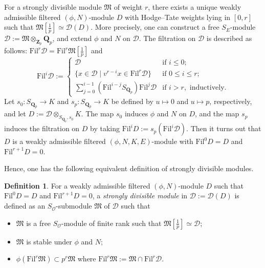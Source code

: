 \documentclass[11pt]{amsart}
\theoremstyle{definition}
\numberwithin{equation}{subsection}
\theoremstyle{plain}
\theoremstyle{plain}
\theoremstyle{plain}
\theoremstyle{plain}
\theoremstyle{plain}
\theoremstyle{plain}
\theoremstyle{plain}
\theoremstyle{plain}
\theoremstyle{plain}
\theoremstyle{plain}
\theoremstyle{plain}
\theoremstyle{plain}
\theoremstyle{definition}
\newtheorem{defi}[equation]{Definition}
\theoremstyle{definition}
\theoremstyle{definition}
\theoremstyle{remark}
\renewcommand{\(}{\textup{(}}
\renewcommand{\)}{\textup{)}}
\newcommand{\Q}{\mathbf{Q}}
\newcommand{\Z}{\mathbf{Z}}
\newcommand{\fM}{\mathfrak{M}}
\newcommand{\Fil}{\mathrm{Fil}}
\newcommand{\cD}{\mathcal{D}}
\newcommand{\cO}{\mathcal{O}}
\begin{document}
For a strongly divisible module $\fM$ of weight $r$, there exists a unique weakly admissible filtered $(\phi,N)$-module $D$ with Hodge--Tate weights lying in $[0,r]$ such that $\fM[\frac{1}{p}]\simeq \cD(D)$. More precisely, one can construct a free $S_E$-module $\cD:=\fM\otimes_{\Z_p}\Q_p$, and extend $\phi$ and $N$ on $\cD$. The filtration on $\cD$ is described as follows: $\Fil^r\cD=\Fil^r\fM[\frac{1}{p}]$ and
\begin{equation*}
\Fil^i\cD:=
\begin{cases}
\cD &\mbox{if }i\leq 0;\\
\{x\in\cD\mid v^{r-i}x\in\Fil^r\cD\}&\mbox{if }0\leq i\leq r;\\
\sum_{j=0}^{i-1}(\Fil^{i-j}S_{\Q_p})\Fil^j\cD & \mbox{if }i>r, \mbox{ inductively.}
\end{cases}
\end{equation*}
Let $s_0:S_{\Q_p}\rightarrow K$ and $s_p:S_{\Q_p}\rightarrow K$ be defined by $u\mapsto 0$ and $u\mapsto p$, respectively, and let $D:=\cD\otimes_{S_{\Q_p},s_0}K$. The map $s_0$ induces $\phi$ and $N$ on $D$, and the map $s_p$ induces the filtration on $D$ by taking $\Fil^iD:=s_p(\Fil^i\cD)$. Then it turns out that $D$ is a weakly admissible filtered $(\phi,N,K,E)$-module with $\Fil^0D=D$ and $\Fil^{r+1}D=0$.

Hence, one has the following equivalent definition of strongly divisible modules.
\begin{defi}\label{defi: sdm in D}
For a weakly admissible filtered $(\phi,N)$-module $D$ such that $\Fil^{0}D=D$ and $\Fil^{r+1}D=0$, a \emph{strongly divisible module} in $\cD:=\cD(D)$ is defined as an $S_{\cO}$-submodule $\fM$ of $\cD$ such that
\begin{itemize}[leftmargin=*]
\item $\fM$ is a free $S_{\cO}$-module of finite rank such that $\fM[\frac{1}{p}]\simeq\cD$;
\item $\fM$ is stable under $\phi$ and $N$;
\item $\phi(\Fil^r\fM)\subset p^{r}\fM$ where $\Fil^r\fM:=\fM\cap\Fil^r\cD$.
\end{itemize}
\end{defi}
\end{document}
